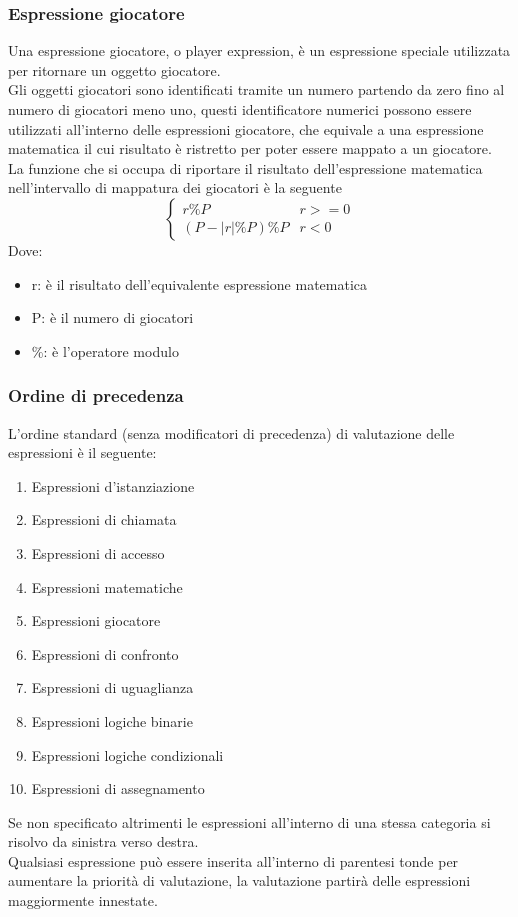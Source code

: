 \subsubsection{Espressione giocatore} \label{EspressioniGiocatore}
Una espressione giocatore, o player expression, è un espressione speciale utilizzata per ritornare 
un oggetto giocatore. 
\\
Gli oggetti giocatori sono identificati tramite un numero partendo da zero fino al numero di giocatori meno uno,
questi identificatore numerici possono essere utilizzati all'interno delle espressioni giocatore, che equivale 
a una espressione matematica il cui risultato è ristretto per poter essere mappato a un giocatore.
\\
La funzione che si occupa di riportare il risultato dell'espressione matematica nell'intervallo di 
mappatura dei giocatori è la seguente
\[
\begin{cases}
    r \% P  & r >= 0 \\
    (P - |r| \% P) \% P & r < 0
\end{cases}
\] 
Dove:
\begin{itemize}
    \item r: è il risultato dell'equivalente espressione matematica
    \item P: è il numero di giocatori
    \item \%: è l'operatore modulo
\end{itemize}

\subsubsection{Ordine di precedenza}
L'ordine standard (senza modificatori di precedenza) di valutazione delle espressioni è il seguente:
\begin{enumerate}
    \item Espressioni d'istanziazione
    \item Espressioni di chiamata
    \item Espressioni di accesso
    \item Espressioni matematiche
    \item Espressioni giocatore
    \item Espressioni di confronto
    \item Espressioni di uguaglianza 
    \item Espressioni logiche binarie 
    \item Espressioni logiche condizionali 
    \item Espressioni di assegnamento
\end{enumerate}
Se non specificato altrimenti le espressioni all'interno di una stessa categoria 
si risolvo da sinistra verso destra. \\
Qualsiasi espressione può essere inserita all'interno di parentesi tonde per aumentare 
la priorità di valutazione, la valutazione partirà delle espressioni maggiormente innestate.

